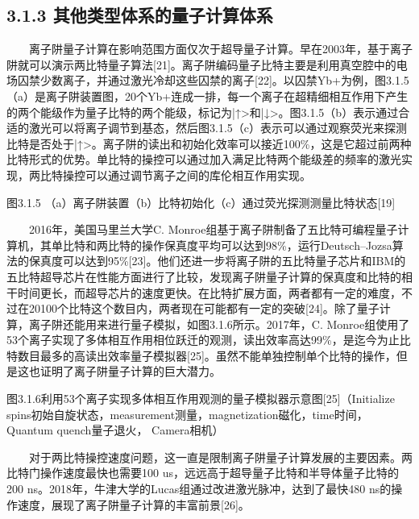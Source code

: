 \documentclass[a4paper,11pt,english]{sphinxmanual}
\begin{document}
\subsection{3.1.3 其他类型体系的量子计算体系}
\label{\detokenize{rst/3.1_u91cf_u5b50_u82af_u7247:id4}}
\sphinxAtStartPar
{}

\sphinxAtStartPar
  离子阱量子计算在影响范围方面仅次于超导量子计算。早在2003年，基于离子阱就可以演示两比特量子算法{[}21{]}。离子阱编码量子比特主要是利用真空腔中的电场囚禁少数离子，并通过激光冷却这些囚禁的离子{[}22{]}。以囚禁Yb+为例，图3.1.5（a）是离子阱装置图，20个Yb+连成一排，每一个离子在超精细相互作用下产生的两个能级作为量子比特的两个能级，标记为|↑>和|↓>。图3.1.5（b）表示通过合适的激光可以将离子调节到基态，然后图3.1.5（c）表示可以通过观察荧光来探测比特是否处于|↑>。离子阱的读出和初始化效率可以接近100\%，这是它超过前两种比特形式的优势。单比特的操控可以通过加入满足比特两个能级差的频率的激光实现，两比特操控可以通过调节离子之间的库伦相互作用实现。


\begin{center}图3.1.5 （a）离子阱装置（b）比特初始化（c）通过荧光探测测量比特状态{[}19{]}
\end{center}
\sphinxAtStartPar
  2016年，美国马里兰大学C. Monroe组基于离子阱制备了五比特可编程量子计算机，其单比特和两比特的操作保真度平均可以达到98\%，运行Deutsch–Jozsa算法的保真度可以达到95\%{[}23{]}。他们还进一步将离子阱的五比特量子芯片和IBM的五比特超导芯片在性能方面进行了比较，发现离子阱量子计算的保真度和比特的相干时间更长，而超导芯片的速度更快。在比特扩展方面，两者都有一定的难度，不过在20\sphinxhyphen{}100个比特这个数目内，两者现在可能都有一定的突破{[}24{]}。除了量子计算，离子阱还能用来进行量子模拟，如图3.1.6所示。2017年，C. Monroe组使用了53个离子实现了多体相互作用相位跃迁的观测，读出效率高达99\%，是迄今为止比特数目最多的高读出效率量子模拟器{[}25{]}。虽然不能单独控制单个比特的操作，但是这也证明了离子阱量子计算的巨大潜力。


\begin{center}图3.1.6利用53个离子实现多体相互作用观测的量子模拟器示意图{[}25{]}（Initialize spins\sphinxhyphen{}初始自旋状态，measurement\sphinxhyphen{}测量，magnetization\sphinxhyphen{}磁化，time\sphinxhyphen{}时间，Quantum quench\sphinxhyphen{}量子退火， Camera\sphinxhyphen{}相机）
\end{center}
\sphinxAtStartPar
  对于两比特操控速度问题，这一直是限制离子阱量子计算发展的主要因素。两比特门操作速度最快也需要100 us，远远高于超导量子比特和半导体量子比特的200 ns。2018年，牛津大学的Lucas组通过改进激光脉冲，达到了最快480 ns的操作速度，展现了离子阱量子计算的丰富前景{[}26{]}。
\end{document}
